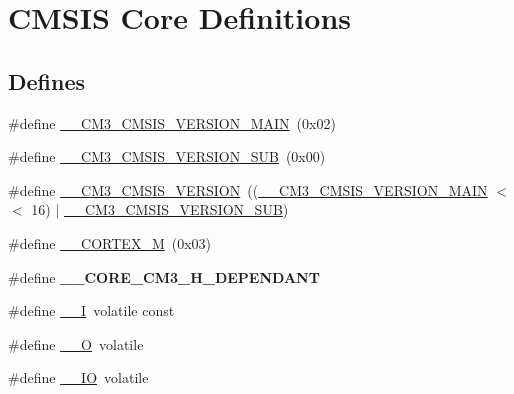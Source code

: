 \hypertarget{group___c_m_s_i_s__core__definitions}{\section{\-C\-M\-S\-I\-S \-Core \-Definitions}
\label{group___c_m_s_i_s__core__definitions}
}
\subsection*{\-Defines}
\begin{DoxyCompactItemize}
\item 
\#define \hyperlink{group___c_m_s_i_s__core__definitions_gac1c1120e9fe082fac8225c60143ac79a}{\-\_\-\-\_\-\-C\-M3\-\_\-\-C\-M\-S\-I\-S\-\_\-\-V\-E\-R\-S\-I\-O\-N\-\_\-\-M\-A\-I\-N}~(0x02)
\item 
\#define \hyperlink{group___c_m_s_i_s__core__definitions_ga9ff7a998d4b8b3c87bfaca6e78607950}{\-\_\-\-\_\-\-C\-M3\-\_\-\-C\-M\-S\-I\-S\-\_\-\-V\-E\-R\-S\-I\-O\-N\-\_\-\-S\-U\-B}~(0x00)
\item 
\#define \hyperlink{group___c_m_s_i_s__core__definitions_gaf888c651cd8c93fd25364f9e74306a1c}{\-\_\-\-\_\-\-C\-M3\-\_\-\-C\-M\-S\-I\-S\-\_\-\-V\-E\-R\-S\-I\-O\-N}~((\hyperlink{group___c_m_s_i_s__core__definitions_gac1c1120e9fe082fac8225c60143ac79a}{\-\_\-\-\_\-\-C\-M3\-\_\-\-C\-M\-S\-I\-S\-\_\-\-V\-E\-R\-S\-I\-O\-N\-\_\-\-M\-A\-I\-N} $<$$<$ 16) $|$ \hyperlink{group___c_m_s_i_s__core__definitions_ga9ff7a998d4b8b3c87bfaca6e78607950}{\-\_\-\-\_\-\-C\-M3\-\_\-\-C\-M\-S\-I\-S\-\_\-\-V\-E\-R\-S\-I\-O\-N\-\_\-\-S\-U\-B})
\item 
\#define \hyperlink{group___c_m_s_i_s__core__definitions_ga63ea62503c88acab19fcf3d5743009e3}{\-\_\-\-\_\-\-C\-O\-R\-T\-E\-X\-\_\-\-M}~(0x03)
\item 
\hypertarget{group___c_m_s_i_s__core__definitions_ga8fbb068b8003976152cf1d6197778e95}{\#define {\bfseries \-\_\-\-\_\-\-C\-O\-R\-E\-\_\-\-C\-M3\-\_\-\-H\-\_\-\-D\-E\-P\-E\-N\-D\-A\-N\-T}}\label{group___c_m_s_i_s__core__definitions_ga8fbb068b8003976152cf1d6197778e95}

\item 
\#define \hyperlink{group___c_m_s_i_s__core__definitions_gaf63697ed9952cc71e1225efe205f6cd3}{\-\_\-\-\_\-\-I}~volatile const
\item 
\#define \hyperlink{group___c_m_s_i_s__core__definitions_ga7e25d9380f9ef903923964322e71f2f6}{\-\_\-\-\_\-\-O}~volatile
\item 
\#define \hyperlink{group___c_m_s_i_s__core__definitions_gaec43007d9998a0a0e01faede4133d6be}{\-\_\-\-\_\-\-I\-O}~volatile
\end{DoxyCompactItemize}


